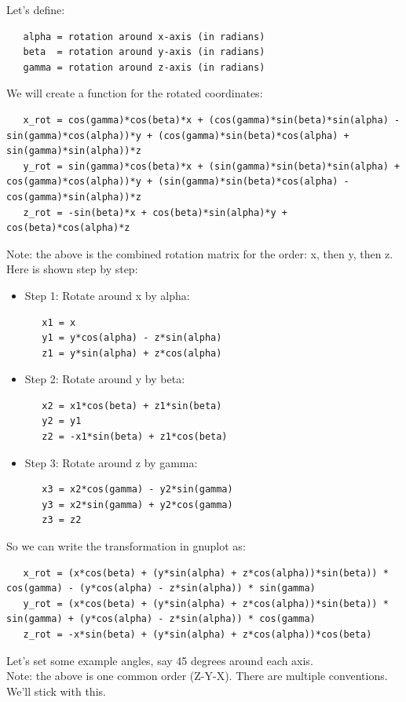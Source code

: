 \documentclass[a4paper,10pt]{article}
\begin{document}
Let's define:
\begin{verbatim}
   alpha = rotation around x-axis (in radians)
   beta  = rotation around y-axis (in radians)
   gamma = rotation around z-axis (in radians)
\end{verbatim}
We will create a function for the rotated coordinates:
{
\tiny
\begin{verbatim}
   x_rot = cos(gamma)*cos(beta)*x + (cos(gamma)*sin(beta)*sin(alpha) - sin(gamma)*cos(alpha))*y + (cos(gamma)*sin(beta)*cos(alpha) + sin(gamma)*sin(alpha))*z
   y_rot = sin(gamma)*cos(beta)*x + (sin(gamma)*sin(beta)*sin(alpha) + cos(gamma)*cos(alpha))*y + (sin(gamma)*sin(beta)*cos(alpha) - cos(gamma)*sin(alpha))*z
   z_rot = -sin(beta)*x + cos(beta)*sin(alpha)*y + cos(beta)*cos(alpha)*z
\end{verbatim}
}
Note: the above is the combined rotation matrix for the order: x, then y, then z.\\
Here is shown step by step:\\
\begin{itemize}
\item Step 1: Rotate around x by alpha:
\begin{verbatim}
   x1 = x
   y1 = y*cos(alpha) - z*sin(alpha)
   z1 = y*sin(alpha) + z*cos(alpha)
\end{verbatim}
\item Step 2: Rotate around y by beta:
\begin{verbatim}
   x2 = x1*cos(beta) + z1*sin(beta)
   y2 = y1
   z2 = -x1*sin(beta) + z1*cos(beta)
\end{verbatim}
\item Step 3: Rotate around z by gamma:
\begin{verbatim}
   x3 = x2*cos(gamma) - y2*sin(gamma)
   y3 = x2*sin(gamma) + y2*cos(gamma)
   z3 = z2
\end{verbatim}
\end{itemize}
So we can write the transformation in gnuplot as:
{
\scriptsize
\begin{verbatim}
   x_rot = (x*cos(beta) + (y*sin(alpha) + z*cos(alpha))*sin(beta)) * cos(gamma) - (y*cos(alpha) - z*sin(alpha)) * sin(gamma)
   y_rot = (x*cos(beta) + (y*sin(alpha) + z*cos(alpha))*sin(beta)) * sin(gamma) + (y*cos(alpha) - z*sin(alpha)) * cos(gamma)
   z_rot = -x*sin(beta) + (y*sin(alpha) + z*cos(alpha))*cos(beta)
\end{verbatim}
}
Let's set some example angles, say 45 degrees around each axis.\\
Note: the above is one common order (Z-Y-X). There are multiple conventions. We'll stick with this.
\end{document}
